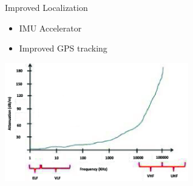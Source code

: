 \begin{frame}{Improved Localization }
    \begin{itemize}
        \item IMU Accelerator
        \item Improved GPS tracking
    \end{itemize}   
    \includegraphics[height=0.6\textheight, width=0.6\textwidth, keepaspectratio]{images/RF-attenuation-in-sea-water-41.png}
\end{frame}



